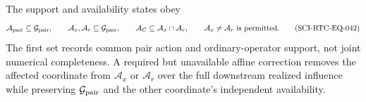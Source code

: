The support and availability states obey
\begin{equation}
 \mathcal A_{\rm pair}\subseteq\mathcal G_{\rm pair},\qquad
 \mathcal A_x,\mathcal A_r\subseteq\mathcal G_{\rm pair},\qquad
 \mathcal A_C\subseteq\mathcal A_x\cap\mathcal A_r,
 \qquad \mathcal A_x\ne\mathcal A_r\ \text{is permitted}.
 \tag{SCI-RTC-EQ-042}\label{eq:support-availability-partition}
\end{equation}
The first set records common pair action and ordinary-operator support, not
joint numerical completeness.  A required but unavailable affine correction
removes the affected coordinate from $\mathcal A_x$ or $\mathcal A_r$ over
the full downstream realized influence while preserving
$\mathcal G_{\rm pair}$ and the other coordinate's independent availability.
